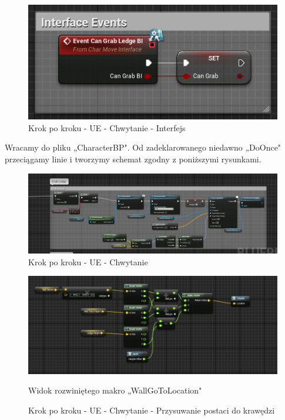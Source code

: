 \documentclass[openright]{xmgr}
\begin{document}
\begin{figure}[!htb]
    \begin{center}
    \includegraphics[scale=0.5]{Screeny/UeKrokPoKroku/CanGrabInterface}
    \end{center}
    \caption{Krok po kroku - UE - Chwytanie - Interfejs}
\end{figure}

\newpage
Wracamy do pliku „CharacterBP". Od zadeklarowanego niedawno „DoOnce" przeciągamy linie i tworzymy schemat zgodny z poniższymi rysunkami.

\begin{figure}[!htb]
    \begin{center}
    \includegraphics[scale=0.5]{Screeny/UeKrokPoKroku/GrabLedge}
    \end{center}
    \caption{Krok po kroku - UE - Chwytanie}
\end{figure}

\begin{figure}[!htb]
    \begin{center}
    \includegraphics[scale=0.5]{Screeny/UeKrokPoKroku/WallGoToLocation}
    \end{center}
    \caption{Krok po kroku - UE - Chwytanie - Przysuwanie postaci do krawędzi}
    Widok rozwiniętego makro „WallGoToLocation"
\end{figure}
\end{document}
